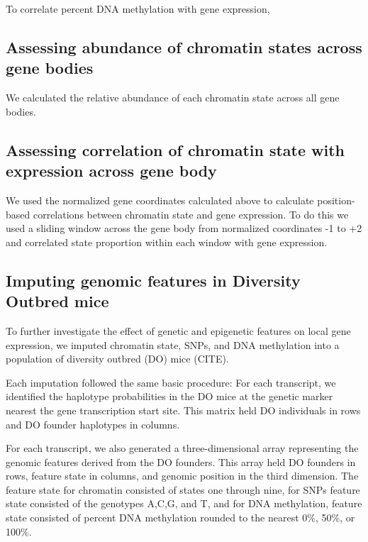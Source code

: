\documentclass[10pt,letterpaper]{article}
\begin{document}
To correlate percent DNA methylation with gene expression,

\hypertarget{assessing-abundance-of-chromatin-states-across-gene-bodies}{%
\subsection{Assessing abundance of chromatin states across gene
bodies}\label{assessing-abundance-of-chromatin-states-across-gene-bodies}}

We calculated the relative abundance of each chromatin state across all
gene bodies.

\hypertarget{assessing-correlation-of-chromatin-state-with-expression-across-gene-body}{%
\subsection{Assessing correlation of chromatin state with expression
across gene
body}\label{assessing-correlation-of-chromatin-state-with-expression-across-gene-body}}

We used the normalized gene coordinates calculated above to calculate
position-based correlations between chromatin state and gene expression.
To do this we used a sliding window across the gene body from normalized
coordinates -1 to +2 and correlated state proportion within each window
with gene expression.

\hypertarget{imputing-genomic-features-in-diversity-outbred-mice}{%
\subsection{Imputing genomic features in Diversity Outbred
mice}\label{imputing-genomic-features-in-diversity-outbred-mice}}

To further investigate the effect of genetic and epigenetic features on
local gene expression, we imputed chromatin state, SNPs, and DNA
methylation into a population of diversity outbred (DO) mice (CITE).

Each imputation followed the same basic procedure: For each transcript,
we identified the haplotype probabilities in the DO mice at the genetic
marker nearest the gene transcription start site. This matrix held DO
individuals in rows and DO founder haplotypes in columns.

For each transcript, we also generated a three-dimensional array
representing the genomic features derived from the DO founders. This
array held DO founders in rows, feature state in columns, and genomic
position in the third dimension. The feature state for chromatin
consisted of states one through nine, for SNPs feature state consisted
of the genotypes A,C,G, and T, and for DNA methylation, feature state
consisted of percent DNA methylation rounded to the nearest 0\%, 50\%,
or 100\%.
\end{document}
